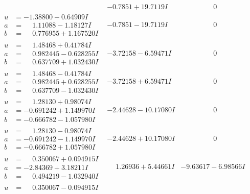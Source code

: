\documentclass[1p]{elsarticle_modified}
\theoremstyle{definition}
\begin{document}
$$\begin{array}{c|c|c}
 & -0.7851 + 19.7119 I & \phantom{-0.000000 } 0 \\ \hline\begin{aligned}
u &= -1.38800 - 0.64909 I \\
a &= \phantom{-}1.11088 - 1.18127 I \\
b &= \phantom{-}0.776955 + 1.167520 I\end{aligned}
 & -0.7851 - 19.7119 I & \phantom{-0.000000 } 0 \\ \hline\begin{aligned}
u &= \phantom{-}1.48468 + 0.41784 I \\
a &= \phantom{-}0.982445 - 0.628255 I \\
b &= \phantom{-}0.637709 + 1.032430 I\end{aligned}
 & -3.72158 - 6.59471 I & \phantom{-0.000000 } 0 \\ \hline\begin{aligned}
u &= \phantom{-}1.48468 - 0.41784 I \\
a &= \phantom{-}0.982445 + 0.628255 I \\
b &= \phantom{-}0.637709 - 1.032430 I\end{aligned}
 & -3.72158 + 6.59471 I & \phantom{-0.000000 } 0 \\ \hline\begin{aligned}
u &= \phantom{-}1.28130 + 0.98074 I \\
a &= -0.691242 + 1.149970 I \\
b &= -0.666782 - 1.057980 I\end{aligned}
 & -2.44628 - 10.17080 I & \phantom{-0.000000 } 0 \\ \hline\begin{aligned}
u &= \phantom{-}1.28130 - 0.98074 I \\
a &= -0.691242 - 1.149970 I \\
b &= -0.666782 + 1.057980 I\end{aligned}
 & -2.44628 + 10.17080 I & \phantom{-0.000000 } 0 \\ \hline\begin{aligned}
u &= \phantom{-}0.350067 + 0.094915 I \\
a &= -2.84369 + 3.18211 I \\
b &= \phantom{-}0.494219 - 1.032940 I\end{aligned}
 & \phantom{-}1.26936 + 5.44661 I & -9.63617 - 6.98566 I \\ \hline\begin{aligned}
u &= \phantom{-}0.350067 - 0.094915 I \\

\end{aligned}
\end{array}$$
\end{document}
